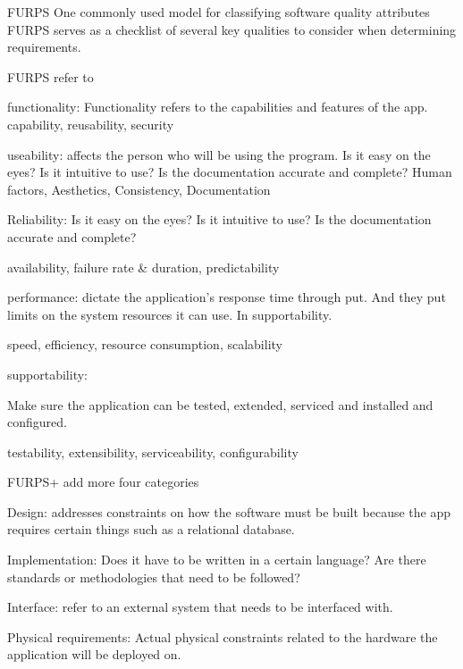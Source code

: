 
FURPS 
One commonly used model for classifying software quality attributes 
FURPS serves as a checklist of several key qualities to consider when determining requirements. 

FURPS refer to 

functionality:  Functionality refers to the capabilities and features of the app. 
  capability, reusability, security 

useability:  affects the person who will be using the program.
Is it easy on the eyes?
 Is it intuitive to use? 
 Is the documentation accurate and complete? 
  Human factors, Aesthetics, Consistency, Documentation 

Reliability:
  Is it easy on the eyes? Is it intuitive to use? 
  Is the documentation accurate and complete? 

  availability, failure rate & duration, predictability

performance: 
  dictate the application's response time through put. 
  And they put limits on the system resources it can use. In supportability. 

  speed, efficiency, resource consumption, scalability 

supportability:

  Make sure the application can be tested, extended, serviced and installed and configured.

  testability, extensibility, serviceability, configurability   


FURPS+   add more four categories  

Design:
  addresses constraints on how the software must be built because the app requires certain things such as a relational database.

Implementation:
  Does it have to be written in a certain language?
  Are there standards or methodologies that need to be followed?

Interface: 
  refer to an external system that needs to be interfaced with. 

Physical requirements:
  Actual physical constraints related to the hardware the application will be deployed on.